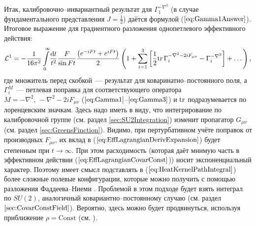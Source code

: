 
Итак, калибровочно--инвариантный результат для $\Gamma_1^{-\nabla^2}$ (в случае фундаментального представления $J=\frac12$) даётся формулой ($\ref{eq:Gamma1Answer}$).
Итоговое выражение для градиентного разложения однопетлевого эффективного действия:
\begin{equation}
	\label{eq:EffLagrangianDerivExpansion}
	\mathcal{L}^1=-\frac{1}{16\pi^2}\int\limits_0^\infty\!\frac{\mathrm{d} t}{t^2}\frac{F}{\sin{Ft}}\frac{\left(e^{-iFt}+e^{iFt}\right)}{2}\left(1+\sum\limits_{i=1}^3\left[\frac12 \mathrm{tr}\,\Gamma_i^{-\nabla^2-2iF_{\mu \nu}}-\Gamma_i^{-\nabla^2}\right]+\dots\right),
\end{equation}
где множитель перед скобкой~--- результат для коваринатно--постоянного поля, а $\Gamma_i^M$~--- петлевая поправка для соответствующего оператора $M=-\nabla^2,\,-\nabla^2-2iF_{\mu \nu}$ ($\ref{eq:Gamma1}$--$\ref{eq:Gamma3}$) и $\mathrm{tr}$ подразумевается  по лоренцевским значкам. Здесь надо иметь в виду, что интегрирование по калибровочной группе (см. раздел \ref{sec:SU2Integration}) изменит пропагатор $G_{\mu \nu}$ (см. раздел \ref{sec:GreensFinction}). Видимо, при пертурбативном учёте поправок от производных $F_{\mu \nu}$, их вклад в ($\ref{eq:EffLagrangianDerivExpansion}$) будет степенным при $t\to\infty$. При этом расходимость (которая даёт мнимую часть в эффективном действии ($\ref{eq:EffLagrangianCovarConst}$)) носит экспоненциальный характер. Поэтому имеет смысл подставлять в ($\ref{eq:HeatKernelPathIntegral}$) более сложные полевые конфигурации, которые можно получить с помощью разложения Фаддеева--Ниеми \cite{Faddeev2007}. Проблемой в этом подходе будет взять интеграл по $SU(2)$, аналогичный ковариантно--постоянному случаю (см. раздел $\ref{sec:CovarConstField}$). Вероятно, здесь можно будет продвинуться, используя приближение $\rho=\text{Const}$ (см. \cite{Faddeev2007}).